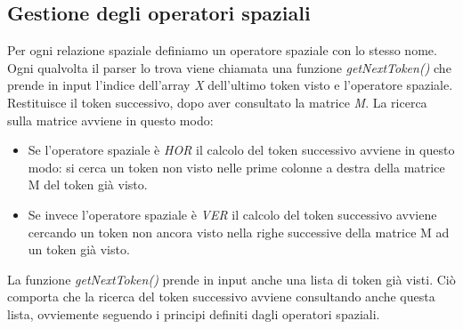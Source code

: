 \subsection{Gestione degli operatori spaziali}
Per ogni relazione spaziale definiamo un operatore spaziale con lo stesso nome. Ogni qualvolta il parser lo trova viene chiamata una funzione \textit{getNextToken()} che prende in input l'indice dell'array \textit{X} dell'ultimo token visto e l'operatore spaziale. Restituisce il token successivo, dopo aver consultato la matrice \textit{M}. La ricerca sulla matrice avviene in questo modo:
\begin{itemize}
	\item Se l'operatore spaziale è \textit{HOR} il calcolo del token successivo avviene in questo modo: si cerca un token non visto nelle prime colonne a destra della matrice M del token già visto.
	\item Se invece l'operatore spaziale è \textit{VER} il calcolo del token successivo avviene cercando un token non ancora visto nella righe successive della matrice M ad un token già visto.
\end{itemize}
La funzione \textit{getNextToken()} prende in input anche una lista di token già visti. Ciò comporta che la ricerca del token successivo avviene consultando anche questa lista, ovviemente seguendo i principi definiti dagli operatori spaziali.